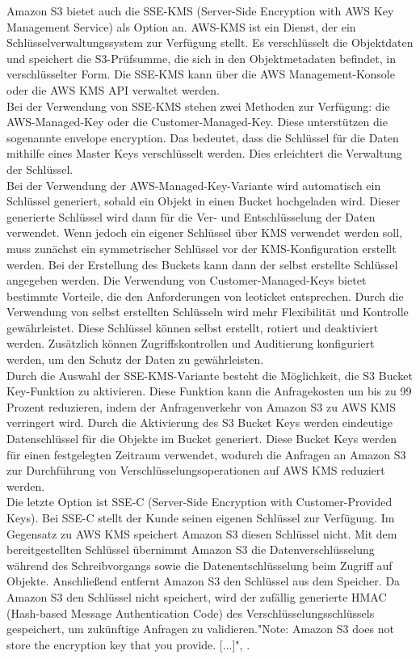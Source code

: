 Amazon S3 bietet auch die SSE-KMS (Server-Side Encryption with AWS Key Management Service) als Option an. AWS-KMS ist ein Dienst, der ein Schlüsselverwaltungssystem zur Verfügung stellt. Es verschlüsselt die Objektdaten und speichert die S3-Prüfsumme, die sich in den Objektmetadaten befindet, in verschlüsselter Form. Die SSE-KMS kann über die AWS Management-Konsole oder die AWS KMS API verwaltet werden.\\

Bei der Verwendung von SSE-KMS stehen zwei Methoden zur Verfügung: die AWS-Managed-Key oder die Customer-Managed-Key. Diese unterstützen die sogenannte \glqq envelope encryption\grqq. Das bedeutet, dass die Schlüssel für die Daten mithilfe eines Master Keys verschlüsselt werden. Dies erleichtert die Verwaltung der Schlüssel.\\

Bei der Verwendung der AWS-Managed-Key-Variante wird automatisch ein Schlüssel generiert, sobald ein Objekt in einen Bucket hochgeladen wird. Dieser generierte Schlüssel wird dann für die Ver- und Entschlüsselung der Daten verwendet. Wenn jedoch ein eigener Schlüssel über KMS verwendet werden soll, muss zunächst ein symmetrischer Schlüssel vor der KMS-Konfiguration erstellt werden. Bei der Erstellung des Buckets kann dann der selbst erstellte Schlüssel angegeben werden. Die Verwendung von Customer-Managed-Keys bietet bestimmte Vorteile, die den Anforderungen von leoticket entsprechen. Durch die Verwendung von selbst erstellten Schlüsseln wird mehr Flexibilität und Kontrolle gewährleistet. Diese Schlüssel können selbst erstellt, rotiert und deaktiviert werden. Zusätzlich können Zugriffskontrollen und Auditierung konfiguriert werden, um den Schutz der Daten zu gewährleisten.\\

Durch die Auswahl der SSE-KMS-Variante besteht die Möglichkeit, die S3 Bucket Key-Funktion zu aktivieren. Diese Funktion kann die Anfragekosten um bis zu 99 Prozent reduzieren, indem der Anfragenverkehr von Amazon S3 zu AWS KMS verringert wird. Durch die Aktivierung des S3 Bucket Keys werden eindeutige Datenschlüssel für die Objekte im Bucket generiert. Diese Bucket Keys werden für einen festgelegten Zeitraum verwendet, wodurch die Anfragen an Amazon S3 zur Durchführung von Verschlüsselungsoperationen auf AWS KMS reduziert werden.\\

Die letzte Option ist SSE-C (Server-Side Encryption with Customer-Provided Keys). Bei SSE-C stellt der Kunde seinen eigenen Schlüssel zur Verfügung. Im Gegensatz zu AWS KMS speichert Amazon S3 diesen Schlüssel nicht. Mit dem bereitgestellten Schlüssel übernimmt Amazon S3 die Datenverschlüsselung während des Schreibvorgangs sowie die Datenentschlüsselung beim Zugriff auf Objekte. Anschließend entfernt Amazon S3 den Schlüssel aus dem Speicher. Da Amazon S3 den Schlüssel nicht speichert, wird der zufällig generierte HMAC (Hash-based Message Authentication Code) des Verschlüsselungsschlüssels gespeichert, um zukünftige Anfragen zu validieren."Note: Amazon S3 does not store the encryption key that you provide. [...]", \cite{aws-sse-c}.\\

